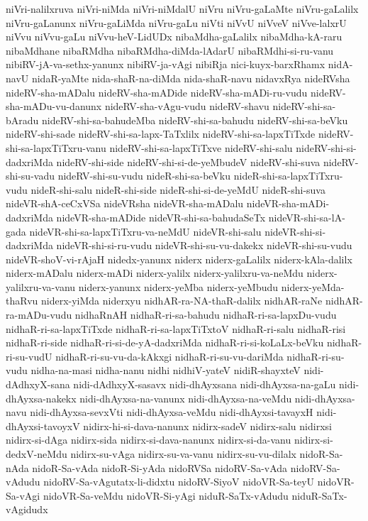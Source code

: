 {niVri-nalilxruva
niVri-niMda
niVri-niMdalU
niVru
niVru-gaLaMte
niVru-gaLalilx
niVru-gaLanunx
niVru-gaLiMda
niVru-gaLu
niVti
niVvU
niVveV
niVve-lalxrU
niVvu
niVvu-gaLu
niVvu-heV-LidUDx
nibaMdha-gaLalilx
nibaMdha-kA-raru
nibaMdhane
nibaRMdha
nibaRMdha-diMda-lAdarU
nibaRMdhi-si-ru-vanu
nibiRV-jA-va-sethx-yanunx
nibiRV-ja-vAgi
nibiRja
nici-kuyx-barxRhamx
nidA-navU
nidaR-yaMte
nida-shaR-na-diMda
nida-shaR-navu
nidavxRya
nideRVsha
nideRV-sha-mADalu
nideRV-sha-mADide
nideRV-sha-mADi-ru-vudu
nideRV-sha-mADu-vu-danunx
nideRV-sha-vAgu-vudu
nideRV-shavu
nideRV-shi-sa-bAradu
nideRV-shi-sa-bahudeMba
nideRV-shi-sa-bahudu
nideRV-shi-sa-beVku
nideRV-shi-sade
nideRV-shi-sa-lapx-TaTxlilx
nideRV-shi-sa-lapxTiTxde
nideRV-shi-sa-lapxTiTxru-vanu
nideRV-shi-sa-lapxTiTxve
nideRV-shi-salu
nideRV-shi-si-dadxriMda
nideRV-shi-side
nideRV-shi-si-de-yeMbudeV
nideRV-shi-suva
nideRV-shi-su-vadu
nideRV-shi-su-vudu
nideR-shi-sa-beVku
nideR-shi-sa-lapxTiTxru-vudu
nideR-shi-salu
nideR-shi-side
nideR-shi-si-de-yeMdU
nideR-shi-suva
nideVR-shA-ceCxVSa
nideVRsha
nideVR-sha-mADalu
nideVR-sha-mADi-dadxriMda
nideVR-sha-mADide
nideVR-shi-sa-bahudaSeTx
nideVR-shi-sa-lA-gada
nideVR-shi-sa-lapxTiTxru-va-neMdU
nideVR-shi-salu
nideVR-shi-si-dadxriMda
nideVR-shi-si-ru-vudu
nideVR-shi-su-vu-dakekx
nideVR-shi-su-vudu
nideVR-shoV-vi-rAjaH
nidedx-yanunx
niderx
niderx-gaLalilx
niderx-kAla-dalilx
niderx-mADalu
niderx-mADi
niderx-yalilx
niderx-yalilxru-va-neMdu
niderx-yalilxru-va-vanu
niderx-yanunx
niderx-yeMba
niderx-yeMbudu
niderx-yeMda-thaRvu
niderx-yiMda
niderxyu
nidhAR-ra-NA-thaR-dalilx
nidhAR-raNe
nidhAR-ra-mADu-vudu
nidhaRnAH
nidhaR-ri-sa-bahudu
nidhaR-ri-sa-lapxDu-vudu
nidhaR-ri-sa-lapxTiTxde
nidhaR-ri-sa-lapxTiTxtoV
nidhaR-ri-salu
nidhaR-risi
nidhaR-ri-side
nidhaR-ri-si-de-yA-dadxriMda
nidhaR-ri-si-koLaLx-beVku
nidhaR-ri-su-vudU
nidhaR-ri-su-vu-da-kAkxgi
nidhaR-ri-su-vu-dariMda
nidhaR-ri-su-vudu
nidha-na-masi
nidha-nanu
nidhi
nidhiV-yateV
nidiR-shayxteV
nidi-dAdhxyX-sana
nidi-dAdhxyX-sasavx
nidi-dhAyxsana
nidi-dhAyxsa-na-gaLu
nidi-dhAyxsa-nakekx
nidi-dhAyxsa-na-vanunx
nidi-dhAyxsa-na-veMdu
nidi-dhAyxsa-navu
nidi-dhAyxsa-sevxVti
nidi-dhAyxsa-veMdu
nidi-dhAyxsi-tavayxH
nidi-dhAyxsi-tavoyxV
nidirx-hi-si-dava-nanunx
nidirx-sadeV
nidirx-salu
nidirxsi
nidirx-si-dAga
nidirx-sida
nidirx-si-dava-nanunx
nidirx-si-da-vanu
nidirx-si-dedxV-neMdu
nidirx-su-vAga
nidirx-su-va-vanu
nidirx-su-vu-dilalx
nidoR-Sa-nAda
nidoR-Sa-vAda
nidoR-Si-yAda
nidoRVSa
nidoRV-Sa-vAda
nidoRV-Sa-vAdudu
nidoRV-Sa-vAgutatx-li-didxtu
nidoRV-SiyoV
nidoVR-Sa-teyU
nidoVR-Sa-vAgi
nidoVR-Sa-veMdu
nidoVR-Si-yAgi
niduR-SaTx-vAdudu
niduR-SaTx-vAgidudx
}

